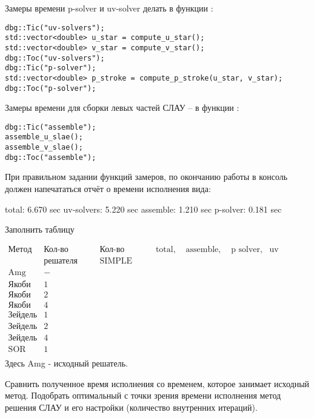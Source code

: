 Замеры времени p-solver и uv-solver делать в функции :
\begin{verbatim}
dbg::Tic("uv-solvers");
std::vector<double> u_star = compute_u_star();
std::vector<double> v_star = compute_v_star();
dbg::Toc("uv-solvers");
dbg::Tic("p-solver");
std::vector<double> p_stroke = compute_p_stroke(u_star, v_star);
dbg::Toc("p-solver");
\end{verbatim}

Замеры времени для сборки левых частей СЛАУ -- в функции :
\begin{verbatim}
dbg::Tic("assemble");
assemble_u_slae();
assemble_v_slae();
dbg::Toc("assemble");
\end{verbatim}

При правильном задании функций замеров, по окончанию работы в консоль должен напечататься отчёт о времени исполнения вида:
\begin{shelloutput}
     total:  6.670 sec
uv-solvers:  5.220 sec
  assemble:  1.210 sec
  p-solver:  0.181 sec
\end{shelloutput}

Заполнить таблицу

\begin{equation*}
\begin{array}{l|c|c|c|c|c|c}
    Метод & \text{Кол-во итераций} & \text{Кол-во итераций} & \text{total, s} & \text{assemble, s} & \text{p solver, s} & \text{uv solvers, s}\\
          & \text{решателя СЛАУ}   & \text{SIMPLE}          & & & & \\
    \hline
    \text{Amg} & - &  & & & & \\
    \hline
    \text{Якоби} & 1 &  &  & & & \\
    \hline
    \text{Якоби} & 2 &  &  & & &\\
    \hline
    \text{Якоби} & 4 &  &  & & &\\
    \hline
    \text{Зейдель} & 1 &  &  & & &\\
    \hline
    \text{Зейдель} & 2 &  &  & & &\\
    \hline
    \text{Зейдель} & 4 &  &  & & &\\
    \hline
    \text{SOR} & 1 &  &  & & &\\
\end{array}
\end{equation*}
Здесь Amg - исходный решатель.

Сравнить полученное время исполнения со временем, которое занимает исходный метод.
Подобрать оптимальный с точки зрения времени исполнения метод решения СЛАУ и его настройки (количество внутренних итераций).
